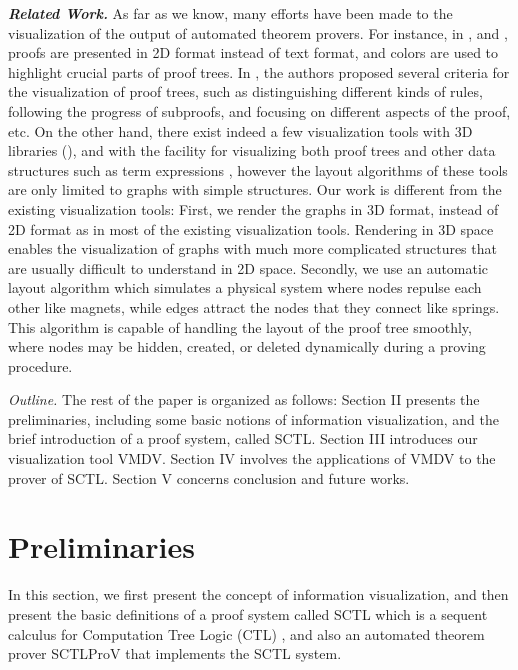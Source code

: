 \documentclass[runningheads]{llncs}
\newcommand\tool[1]{\textsf{#1}}
\newcommand\vmdv{\tool{VMDV}}
\begin{document}
\hspace{-0.5cm}
{\bf \it Related Work.} 
As far as we know, many efforts have been made to the visualization of the output of automated theorem provers. 
For instance, in \cite{byrnes2009visualizing,LibalRR14,sakurai2011mikibeta}, and \cite{steel2005visualising}, 
proofs are presented in 2D format instead of text format, and colors are used to highlight crucial parts of proof trees.
In \cite{LibalRR14}, the authors proposed several criteria for the visualization of proof trees, 
such as distinguishing different kinds of rules, 
following the progress of subproofs, and focusing on different aspects of the proof, etc.
On the other hand, there exist indeed a few visualization tools with 3D libraries (\cite{Farmer200939,bajaj2003interactive}), 
and with the facility for visualizing both proof trees and other data structures such as term expressions \cite{bajaj2003interactive},
however the layout algorithms of these tools are only limited to graphs with simple structures. 
Our work is different from the existing visualization tools:
First, we render the graphs in 3D format, instead of 2D format as in most of the existing visualization tools.
Rendering in 3D space enables the visualization of graphs with much more complicated structures that are usually difficult to understand in 2D space. 
Secondly, we use an automatic layout algorithm which simulates a physical system where nodes repulse each other like magnets, while edges attract the nodes that they connect like springs. 
This algorithm is capable of handling the layout of the proof tree smoothly, where nodes may be hidden, created, or deleted dynamically during a proving procedure.
\smallskip

\hspace{-0.5cm}
{\it Outline.} 
The rest of the paper is organized as follows: 
Section \textsf{II} presents the preliminaries, 
including some basic notions of information visualization, and the brief introduction of a proof system, called \textsf{SCTL}.  
Section \textsf{III} introduces our visualization tool \textsf{VMDV}. 
Section \textsf{IV} involves the applications of \vmdv{} to the prover of \textsf{SCTL}. 
Section \textsf{V} concerns conclusion and future works.

\section{Preliminaries}
In this section, we first present the concept of information visualization, and then present the basic definitions of a proof system called \textsf{SCTL} which is a sequent calculus for Computation Tree Logic (\textsf{CTL}) \cite{EmersonC82,EmersonH85}, and also an automated theorem prover \textsf{SCTLProV} that implements the \textsf{SCTL} system.
\end{document}
